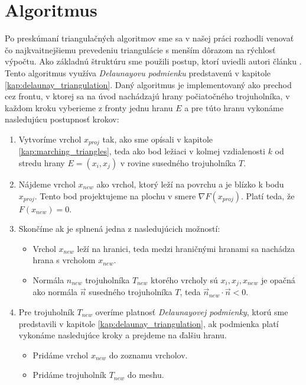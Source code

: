 \chapter{Algoritmus}
\label{kap:algoritmus}
Po preskúmaní triangulačných algoritmov sme sa v našej práci rozhodli venovať čo najkvaitnejšiemu
prevedeniu triangulácie s menším dôrazom na rýchlosť výpočtu. Ako základnú štruktúru sme použili 
postup, ktorí uviedli autori článku \cite{hilton1996marching}. Tento algoritmus využíva 
\textit{Delaunayovu podmienku} predstavenú v kapitole \ref{kap:delaunay_triangulation}.
Daný algoritmus je implementovaný ako prechod cez frontu, v ktorej sa na úvod nachádzajú
hrany počiatočného trojuholníka, v každom kroku vyberieme z fronty jednu hranu $E$ a pre túto
hranu vykonáme nasledujúcu postupnosť krokov:
\begin{enumerate}
    \item{Vytvoríme vrchol $x_{proj}$ tak, ako sme opísali v kapitole \ref{kap:marching_triangles}, teda 
    ako bod ležiaci v kolmej vzdialenosti $k$ od stredu hrany $E = (x_i, x_j)$ 
    v rovine susedného trojuholníka $T$.}
    \item{Nájdeme vrchol $x_{new}$ ako vrchol, ktorý leží na povrchu a je blízko k bodu 
    $x_{proj}$. Tento bod projektujeme na plochu v smere $\nabla F(x_{proj})$.
    Platí teda, že $F(x_{new}) = 0$.}
    \item{Skončíme ak je splnená jedna z nasledujúcich možností:
    \begin{itemize}
        \item{Vrchol $x_{new}$ leží na hranici, teda medzi hraničnými 
        hranami sa nachádza hrana s vrcholom $x_{new}$.}
        \item{Normála $n_{new}$ trojuholníka $T_{new}$ ktorého vrcholy sú $x_i, 
        x_j, x_{new}$ je opačná ako
        normála $\overrightarrow{n}$ susedného trojuholníka $T$, teda 
        $\overrightarrow{n}_{new} \cdot \overrightarrow{n} < 0$.}
    \end{itemize}
    }
    \item{Pre trojuholník $T_{new}$ overíme platnosť \textit{Delaunayovej podmienky}, 
    ktorú sme predstavili v kapitole \ref{kap:delaunay_triangulation}, ak podmienka platí
    vykonáme nasledujúce kroky a prejdeme na ďalšiu hranu.
    \begin{itemize}
        \item{Pridáme vrchol $x_{new}$ do zoznamu vrcholov.}
        \item{Pridáme trojuholník $T_{new}$ do meshu.}

\end{itemize}}
\end{enumerate}
